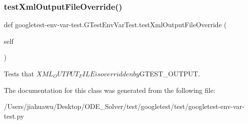 \subsubsection{\texorpdfstring{test\+Xml\+Output\+File\+Override()}{testXmlOutputFileOverride()}}
{\footnotesize\ttfamily def googletest-\/env-\/var-\/test.\+G\+Test\+Env\+Var\+Test.\+test\+Xml\+Output\+File\+Override (\begin{DoxyParamCaption}\item[{}]{self }\end{DoxyParamCaption})}

\begin{DoxyVerb}Tests that $XML_OUTPUT_FILE is overridden by $GTEST_OUTPUT.\end{DoxyVerb}
 

The documentation for this class was generated from the following file\+:\begin{DoxyCompactItemize}
\item 
/\+Users/jiahuawu/\+Desktop/\+O\+D\+E\+\_\+\+Solver/test/googletest/test/googletest-\/env-\/var-\/test.\+py\end{DoxyCompactItemize}
